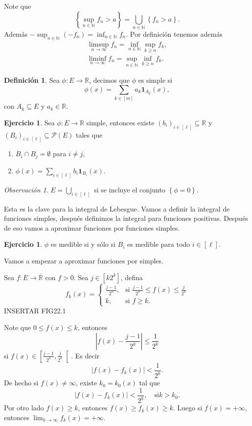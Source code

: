 \documentclass[12pt]{article}
\theoremstyle{plain}
\theoremstyle{definition}
\newtheorem{Def}[Th]{Definición}       %
\newtheorem{Ej}[Th]{Ejercicio}
\theoremstyle{remark}
\newtheorem{Rmk}[Th]{Observación}      %
\numberwithin{equation}{section}
\newcommand{\bN}{\mathbb{N}}        %
\newcommand{\bR}{\mathbb{R}}        %
\newcommand{\cP}{\mathcal{P}}       %
\renewcommand{\geq}{\geqslant}      %
\renewcommand{\leq}{\leqslant}      %
\renewcommand{\:}{\colon}           %
\newcommand{\conj}[1]{\left\lbrace#1\right\rbrace}
\newcommand{\bonj}[1]{\left\lbrack#1\right\rbrack}
\newcommand{\lbonj}[1]{\left\lbrack#1\right\lbrack}
\begin{document}
\begin{multicols}{2}
\begin{ptcbp}
Note que
$$\conj{\sup_{n\in\bN}f_n>a}=\bigcup_{n\in\bN}\conj{f_n>a}.$$
Además $-\sup_{n\in\bN}(-f_n)=\inf_{n\in\bN}f_n$. Por definición tenemos además
\begin{gather*}
  \limsup_{n\to\infty}f_n=\inf_{n\in\bN}\sup_{k\geq n}f_k, \\
  \liminf_{n\to\infty}f_n=\sup_{n\in\bN}\inf_{k\geq n}f_k.
\end{gather*}
\end{ptcbp}

\begin{Def}
  Sea $\phi\: E\to\bR$, decimos que $\phi$ es simple si
  $$\phi(x)=\sum_{k\in\bonj{m}}a_k\mathbf{1}_{A_k}(x),$$
  con $A_k\subseteq E$ y $a_k\in\bR$.
\end{Def}

\begin{Ej}
  Sea $\phi\: E\to\bR$ simple, entonces existe $(b_i)_{i\in\bonj{\ell}}\subseteq \bR$ y $(B_i)_{i\in\bonj{\ell}}\subseteq\cP(E)$ tales que
  \begin{enumerate}
    \item $B_i\cap B_j=\emptyset$ para $i\neq j$,
    \item $\phi(x)=\sum_{i\in\bonj{\ell}}b_i\mathbf{1}_{B_i}(x)$.
  \end{enumerate}
\end{Ej}

\begin{Rmk}
  $E=\bigcup_{i\in\bonj{\ell}}$ si se incluye el conjunto $\conj{\phi=0}$.
\end{Rmk}

Esta es la clave para la integral de Lebesgue. Vamos a definir la integral de funciones simples, después definimos la integral para funciones positivas. Después de eso vamos a aproximar funciones por funciones simples.

\begin{Ej}
  $\phi$ es medible si y sólo si $B_i$ es medible para todo $i\in\bonj{\ell}$.
\end{Ej}

Vamos a empezar a aproximar funciones por simples.\par
Sea $f\: E\to\overline{\bR}$ con $f>0$. Sea $j\in\bonj{k2^k}$, defina
$$
f_k(x)
=
\begin{cases}
  \frac{j-1}{2^k}, & \mbox{si } \frac{j-1}{2^k}\leq f(x)\leq\frac{j}{2^k} \\
  k, & \mbox{si } f\geq k.
\end{cases}
$$
INSERTAR FIG22.1\par
Note que $0\leq f(x)\leq k$, entonces
$$|f(x)-\frac{j-1}{2^k}|\leq \frac{1}{2^k}$$
si $f(x)\in\lbonj{\frac{j-1}{2^k},\frac{j}{2^k}}$. Es decir
$$|f(x)-f_k(x)|<\frac{1}{2^k}.$$
De hecho si $f(x)\neq\infty$, existe $k_0=k_0(x)$ tal que
$$|f(x)-f_k(x)|<\frac{1}{2^k},\quad\text{si} k>k_0.$$
Por otro lado $f(x)\geq k$, entonces $f(x)\geq f_k(x)\geq k$. Luego si $f(x)=+\infty$, entonces $\lim_{k\to\infty}f_k(x)=+\infty$.\par


\end{multicols}
\end{document}
